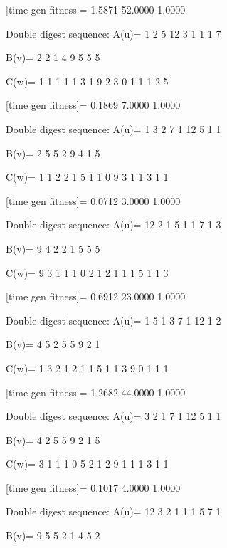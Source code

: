 [time gen fitness]=
    1.5871   52.0000    1.0000

Double digest sequence:
A(u)=
     1     2     5    12     3     1     1     1     7

B(v)=
     2     2     1     4     9     5     5     5

C(w)=
     1     1     1     1     1     3     1     9     2     3     0     1     1     1     2     5

[time gen fitness]=
    0.1869    7.0000    1.0000

Double digest sequence:
A(u)=
     1     3     2     7     1    12     5     1     1

B(v)=
     2     5     5     2     9     4     1     5

C(w)=
     1     1     2     2     1     5     1     1     0     9     3     1     1     3     1     1

[time gen fitness]=
    0.0712    3.0000    1.0000

Double digest sequence:
A(u)=
    12     2     1     5     1     1     7     1     3

B(v)=
     9     4     2     2     1     5     5     5

C(w)=
     9     3     1     1     1     0     2     1     2     1     1     1     5     1     1     3

[time gen fitness]=
    0.6912   23.0000    1.0000

Double digest sequence:
A(u)=
     1     5     1     3     7     1    12     1     2

B(v)=
     4     5     2     5     5     9     2     1

C(w)=
     1     3     2     1     2     1     1     5     1     1     3     9     0     1     1     1

[time gen fitness]=
    1.2682   44.0000    1.0000

Double digest sequence:
A(u)=
     3     2     1     7     1    12     5     1     1

B(v)=
     4     2     5     5     9     2     1     5

C(w)=
     3     1     1     1     0     5     2     1     2     9     1     1     1     3     1     1

[time gen fitness]=
    0.1017    4.0000    1.0000

Double digest sequence:
A(u)=
    12     3     2     1     1     1     5     7     1

B(v)=
     9     5     5     2     1     4     5     2

